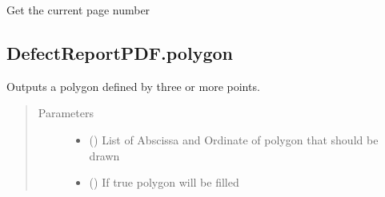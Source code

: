 \documentclass[letterpaper,10pt,english]{sphinxmanual}
\begin{document}
\begin{fulllineitems}
\begin{fulllineitems}
\label{\detokenize{generated/quality_assessment.quality_pdf_report.DefectReportPDF.page_no:quality_assessment.quality_pdf_report.DefectReportPDF.page_no}}
\sphinxAtStartPar
Get the current page number

\end{fulllineitems}



\subsection{DefectReportPDF.polygon}
\label{\detokenize{generated/quality_assessment.quality_pdf_report.DefectReportPDF.polygon:defectreportpdf-polygon}}\label{\detokenize{generated/quality_assessment.quality_pdf_report.DefectReportPDF.polygon::doc}}

\begin{fulllineitems}
\label{\detokenize{generated/quality_assessment.quality_pdf_report.DefectReportPDF.polygon:quality_assessment.quality_pdf_report.DefectReportPDF.polygon}}
\sphinxAtStartPar
Outputs a polygon defined by three or more points.
\begin{quote}\begin{description}
\item[{Parameters}] \leavevmode\begin{itemize}
\item {} 
\sphinxAtStartPar
{} () \textendash{} List of Abscissa and Ordinate of
polygon that should be drawn

\item {} 
\sphinxAtStartPar
{} () \textendash{} If true polygon will be filled

\end{itemize}


\end{description}
\end{quote}
\end{fulllineitems}
\end{fulllineitems}
\end{document}
